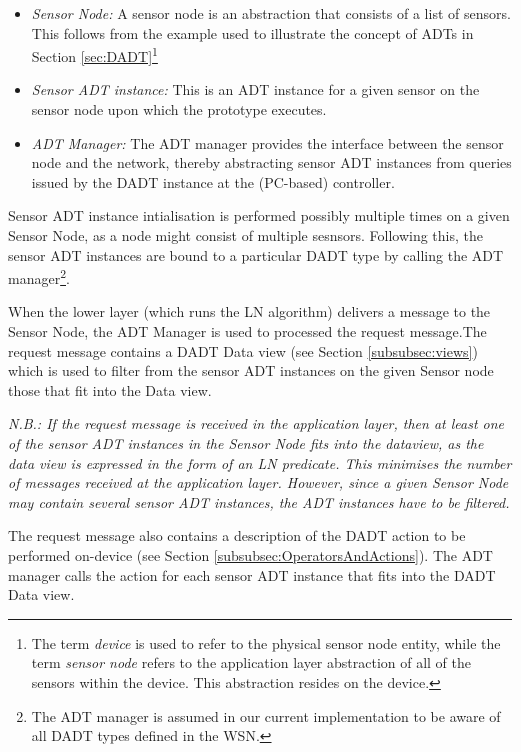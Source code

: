 \begin{itemize}
  \item \emph{Sensor Node:} A sensor node is an abstraction that consists of a
  list of sensors. This follows from the example used to illustrate the concept
  of ADTs in Section \ref{sec:DADT}\footnote{The term \emph{device} is used to
  refer to the physical sensor node entity, while the term \emph{sensor node}
  refers to the application layer abstraction of all of the sensors within the
  device. This abstraction resides on the device.}
  \item \emph{Sensor ADT instance:} This is an ADT instance for a given sensor
  on the sensor node upon which the prototype executes. 
  \item \emph{ADT Manager:} The ADT manager provides the interface between the
  sensor node and the network, thereby abstracting sensor ADT instances from
  queries issued by the DADT instance at the (PC-based) controller.
\end{itemize}

Sensor ADT instance intialisation is performed possibly
multiple times
on a given Sensor Node, as a node might consist of multiple sesnsors. Following
this, the sensor ADT instances are bound to a particular DADT type by calling
the ADT manager\footnote{The ADT manager is assumed in our
current implementation to be aware of all DADT types defined in the WSN.}.

When the lower layer (which runs the LN algorithm) delivers a message to the
Sensor Node, the ADT Manager is used to processed the request message.The
request message contains a DADT Data view (see Section \ref{subsubsec:views})
which is used to filter from the sensor ADT instances on the given Sensor node
those that fit into the Data view. %

\emph{N.B.: If the request message is received in the application layer, then at least
one of the sensor ADT instances in the Sensor Node fits into the dataview, as
the data view is expressed in the form of an LN predicate. This minimises the
number of messages received at the application layer. However, since a given
Sensor Node may contain several sensor ADT instances, the ADT instances have to
be filtered.}

The request message also contains a description of the DADT action to be
performed on-device (see Section
\ref{subsubsec:OperatorsAndActions}). The ADT manager calls the action for each
sensor ADT instance that fits into the DADT Data view. 

